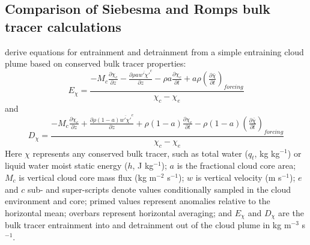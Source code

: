 \documentclass[draft,grl]{AGUTeX}
\begin{document}
\begin{article}
\section{Comparison of Siebesma and Romps bulk tracer calculations}

\cite{Siebesma1995} derive equations for entrainment and detrainment from a 
simple entraining cloud plume based on conserved bulk tracer properties:
\begin{equation}
  \label{eq:siebesma_entrainment}
    E_{\chi} = \frac{- M_c \frac{\partial \chi_c}{\partial z}
        - \frac{\partial \rho a \overline{w' \chi'}^c}{\partial z}
        - \rho a \frac{\partial \chi_c}{\partial t}
        + a \rho \left(\frac{\partial \bar{\chi}}{\partial t}\right)_{forcing}}
        {\chi_c - \chi_e}
\end{equation}
and
\begin{equation}
  \label{eq:siebesma_detrainment}
    D_{\chi} = \frac{- M_c \frac{\partial \chi_e}{\partial z}
        + \frac{\partial \rho (1 - a) \overline{w' \chi'}^e}{\partial z}
        + \rho (1-a) \frac{\partial \chi_e}{\partial t}
     - \rho (1-a) \left(\frac{\partial \bar{\chi}}{\partial t}\right)_{forcing}}
        {\chi_c - \chi_e}
\end{equation}
Here $\chi$ represents any conserved bulk tracer, such as total water ($q_t$, 
kg kg$^{-1}$) or liquid water moist static energy ($h$, J kg$^{-1}$); $a$ is 
the fractional cloud core area; $M_c$ is vertical cloud core mass flux 
(kg m$^{-2}$ s$^{-1}$); $w$ is vertical velocity (m s$^{-1}$); $e$ and $c$ 
sub- and super-scripts denote values conditionally sampled in the cloud 
environment and core; primed values represent anomalies relative to the 
horizontal mean; overbars represent horizontal averaging; and $E_{\chi}$ and 
$D_{\chi}$ are the bulk tracer entrainment into and detrainment out of the 
cloud plume in kg m$^{-3}$ s$^{-1}$.


\end{article}
\end{document}

